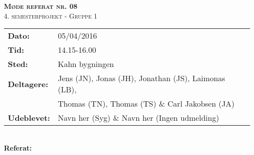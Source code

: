 
\newcommand{\HRule}{\rule{\linewidth}{0.1mm}}


	\begin{center}
		{\huge \bfseries \textsc{Møde referat nr. 08}}\\
		\textsc{\large 4. semesterprojekt - Gruppe 1}\\[0.3cm]
	\end{center}
	\begin{tabular}{ll}
	\large \textbf{Dato:} & 05/04/2016  \\ %
	\large \textbf{Tid:}  & 14.15-16.00 \\ %
	\large \textbf{Sted:} & Kahn bygningen	\\ %
	\large \textbf{Deltagere:} & Jens (JN), Jonas (JH), Jonathan (JS), Laimonas (LB), \\
	\large \textbf & Thomas (TN),  Thomas (TS) \& Carl Jakobsen (JA)\\
	\large \textbf{Udeblevet:} & Navn her (Syg) \& Navn her (Ingen udmelding)	\\
	\end{tabular}\\
	\phantom{\,}\hspace{0.1em} \large \textbf{Referat:}
